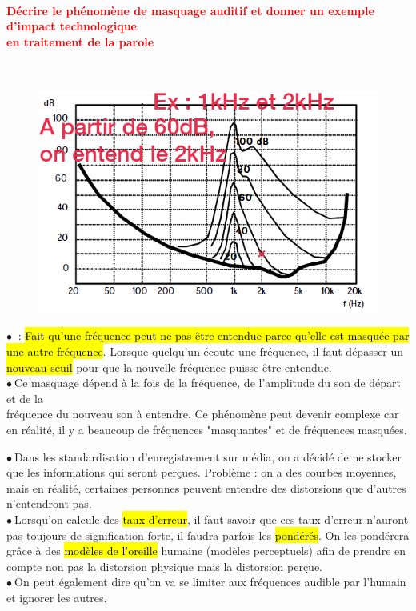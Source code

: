 \documentclass[letterpaper, 12pt]{article}
\newcommand{\alinea}{
\hspace*{0.3cm}}
\newcommand{\red}[1]{
	\textcolor{red}{#1}
}
\newcommand{\myul}[1]{
	\underline{\smash{#1}}
}
\newcommand{\point}{$\bullet\ $}
\begin{document}
		\paragraph{\red{Décrire le phénomène de masquage auditif et donner un exemple d'impact technologique 
		~\\ \hspace*{0.035cm} en traitement de la parole}}~\\
			\begin{minipage}{0.4\textwidth}
				\begin{figure}[H]
					\centering
					\includegraphics[scale=0.6]{Images/masquage}
				\end{figure}\noindent
			\end{minipage}\hfill
			\begin{minipage}{0.55\textwidth}
				\point \myul{Masquage auditif} : \hl{Fait qu'une fr\'equence peut ne pas \^etre entendue parce qu'elle
					est masqu\'ee par une autre fr\'equence}. Lorsque quelqu'un écoute une fréquence,
					il faut dépasser un \hl{nouveau seuil} pour que la nouvelle fréquence puisse être entendue.\\
				\point Ce masquage dépend à la fois de la fréquence, de l'amplitude du son de départ et de la
					\\\alinea fréquence du nouveau son à entendre. Ce phénomène peut devenir complexe car
					en réalité, il y a beaucoup de fréquences "masquantes" et de fréquences masquées.
			\end{minipage}
			\point Dans les standardisation d'enregistrement sur média, on a décidé de ne stocker que les 
				informations qui seront perçues. Problème : on a des courbes moyennes, mais en réalité,
				certaines personnes peuvent entendre des distorsions que d'autres n'entendront pas.\\
			\point Lorsqu'on calcule des \hl{taux d'erreur}, il faut savoir que ces taux d'erreur n'auront pas
				toujours
				de signification forte, il faudra parfois les \hl{pond\'er\'es}. On les pondérera grâce à
				des \hl{mod\`eles de l'oreille} humaine (modèles perceptuels) afin de prendre en compte non
				pas la distorsion physique mais la distorsion perçue.\\
			\point On peut également dire qu'on va se limiter aux fréquences audible par l'humain et 
				ignorer les autres.
\pagebreak
\end{document}
